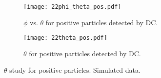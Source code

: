     \begin{figure}
        \centering
        \begin{subfigure}[b]{\textwidth}
            \centering
            \texttt{[image: 22phi\_theta\_pos.pdf]}
            \caption[$\phi$ vs. $\theta$ for positive particles]
            {$\phi$ vs. $\theta$ for positive particles detected by DC.}
            \label{fig::14.22::phi_theta_pos}
        \end{subfigure}
        \begin{subfigure}[b]{\textwidth}
            \centering
            \texttt{[image: 22theta\_pos.pdf]}
            \caption[$\theta$ for positive particles]
            {$\theta$ for positive particles detected by DC.}
            \label{fig::14.22::theta_pos}
        \end{subfigure}
        \caption[$\theta$ study for positive particles]
        {$\theta$ study for positive particles.
        Simulated data.}
        \label{fig::14.22::theta_study_pos}
    \end{figure}
